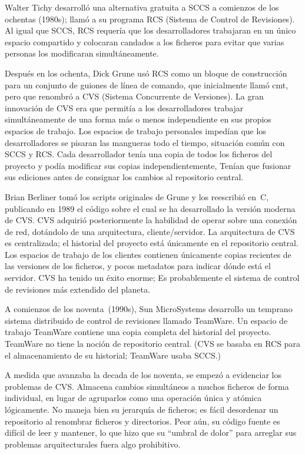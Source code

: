 Walter Tichy desarrolló una alternativa gratuita a SCCS a comienzos
de los ochentas (1980s); llamó a su programa RCS (Sistema de Control de
Revisiones).  Al igual que SCCS, RCS requería que los desarrolladores
trabajaran en un único espacio compartido y colocaran candados a los
ficheros para evitar que varias personas los modificaran
simultáneamente.

Después en los ochenta, Dick Grune usó RCS como un bloque de
construcción para un conjunto de guiones de línea de comando, que
inicialmente llamó cmt, pero que renombró a CVS (Sistema Concurrente de
Versiones).  La gran innovación de CVS era que permitía a los
desarrolladores trabajar simultáneamente de una forma más o menos
independiente en sus propios espacios de trabajo. Los espacios de
trabajo personales impedían que los desarrolladores se pisaran las
mangueras todo el tiempo, situación común con SCCS y RCS.  Cada
desarrollador tenía una copia de todos los ficheros del proyecto y podía
modificar sus copias independientemente, Tenían que fusionar sus
ediciones antes de consignar los cambios al repositorio central.

Brian Berliner tomó los scripts originales de Grune y los reescribió
en~C, publicando en 1989 el código sobre el cual se ha
desarrollado la versión moderna de CVS.  CVS adquirió posteriormente 
la habilidad de operar sobre una conexión de red, dotándolo de una
arquitectura, cliente/servidor. La arquitectura de CVS es
centralizada; el historial del proyecto está únicamente en el
repositorio central.  Los espacios de trabajo de los clientes
contienen únicamente copias recientes de las versiones de los
ficheros, y pocos metadatos para indicar dónde está el servidor. CVS
ha tenido un éxito enorme; Es probablemente el sistema de control de
revisiones más extendido del planeta.

A comienzos de los noventa~(1990s), Sun MicroSystems desarrollo un
temprano sistema distribuido de control de revisiones llamado
TeamWare.
Un espacio de trabajo TeamWare contiene una copia completa del
historial del proyecto. TeamWare no tiene la noción de repositorio
central. (CVS se basaba en RCS para el almacenamiento de su historial;
TeamWare usaba SCCS.)

A medida que avanzaba la decada de los noventa, se empezó a
evidenciar los problemas de CVS.  Almacena cambios simultáneos a muchos
ficheros de forma individual, en lugar de agruparlos como una
operación única y atómica lógicamente.  No maneja bien su jerarquía de
ficheros; es fácil desordenar un repositorio al renombrar ficheros
y directorios. Peor aún, su código fuente es difícil de leer y
mantener, lo que hizo que su ``umbral de dolor'' para arreglar sus
problemas arquitecturales fuera algo prohibitivo.

